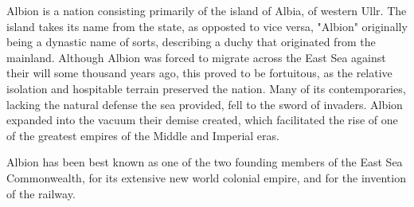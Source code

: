 
	Albion is a nation consisting primarily of the island of Albia, of western Ullr.  The island takes its name from the state, as opposted to vice versa, "Albion" originally being a dynastic name of sorts, describing a duchy that originated from the mainland.  Although Albion was forced to migrate across the East Sea against their will some thousand years ago, this proved to be fortuitous, as the relative isolation and hospitable terrain preserved the nation.  Many of its contemporaries, lacking the natural defense the sea provided, fell to the sword of invaders.  Albion expanded into the vacuum their demise created, which facilitated the rise of one of the greatest empires of the Middle and Imperial eras.

	Albion has been best known as one of the two founding members of the East Sea Commonwealth, for its extensive new world colonial empire, and for the invention of the railway.